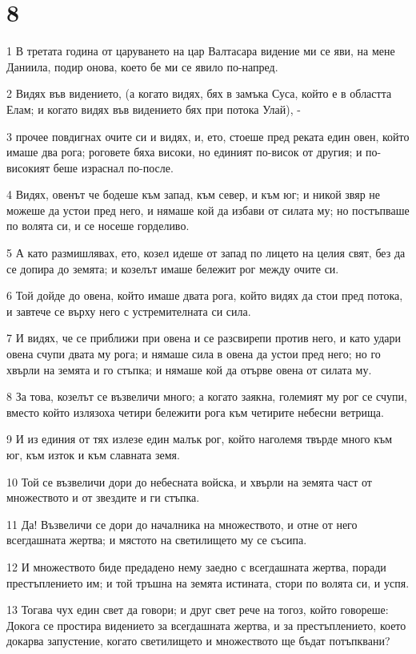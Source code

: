 \chapter{8}

\par 1 В третата година от царуването на цар Валтасара видение ми се яви, на мене Даниила, подир онова, което бе ми се явило по-напред.
\par 2 Видях във видението, (а когато видях, бях в замъка Суса, който е в областта Елам; и когато видях във видението бях при потока Улай), -
\par 3 прочее повдигнах очите си и видях, и, ето, стоеше пред реката един овен, който имаше два рога; роговете бяха високи, но единият по-висок от другия; и по-високият беше израснал по-после.
\par 4 Видях, овенът че бодеше към запад, към север, и към юг; и никой звяр не можеше да устои пред него, и нямаше кой да избави от силата му; но постъпваше по волята си, и се носеше горделиво.
\par 5 А като размишлявах, ето, козел идеше от запад по лицето на целия свят, без да се допира до земята; и козелът имаше бележит рог между очите си.
\par 6 Той дойде до овена, който имаше двата рога, който видях да стои пред потока, и завтече се върху него с устремителната си сила.
\par 7 И видях, че се приближи при овена и се разсвирепи против него, и като удари овена счупи двата му рога; и нямаше сила в овена да устои пред него; но го хвърли на земята и го стъпка; и нямаше кой да отърве овена от силата му.
\par 8 За това, козелът се възвеличи много; а когато заякна, големият му рог се счупи, вместо който излязоха четири бележити рога към четирите небесни ветрища.
\par 9 И из единия от тях излезе един малък рог, който наголемя твърде много към юг, към изток и към славната земя.
\par 10 Той се възвеличи дори до небесната войска, и хвърли на земята част от множеството и от звездите и ги стъпка.
\par 11 Да! Възвеличи се дори до началника на множеството, и отне от него всегдашната жертва; и мястото на светилището му се съсипа.
\par 12 И множеството биде предадено нему заедно с всегдашната жертва, поради престъплението им; и той тръшна на земята истината, стори по волята си, и успя.
\par 13 Тогава чух един свет да говори; и друг свет рече на тогоз, който говореше: Докога се простира видението за всегдашната жертва, и за престъплението, което докарва запустение, когато светилището и множеството ще бъдат потъпквани?
